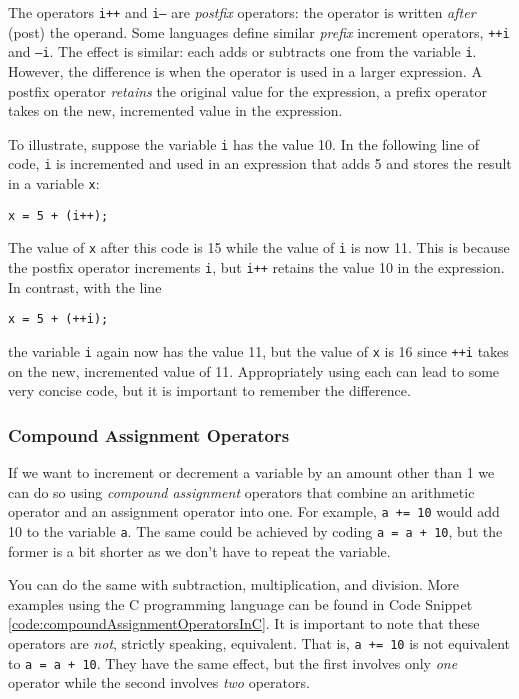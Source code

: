 The operators \texttt{i++} and \texttt{i--} are \emph{postfix} 
operators: the operator is written \emph{after} (post) the operand.  Some languages
define similar \emph{prefix} increment operators, \texttt{++i} and \texttt{--i}.
The effect is similar: each adds or subtracts one from the variable \texttt{i}.
However, the difference is when the operator is used in a larger expression.  A
postfix operator \emph{retains} the original value for the expression, a prefix
operator takes on the new, incremented value in the expression.  

To illustrate, suppose the variable \texttt{i} has the value 10.
In the following line of code, \texttt{i} is incremented and used
in an expression that adds 5 and stores the result in a variable \texttt{x}:

\texttt{x = 5 + (i++);}

The value of \texttt{x} after this code is 15 while the value of \texttt{i}
is now 11.  This is because the postfix operator increments \texttt{i}, but 
\texttt{i++} retains the value 10 in the expression.  In contrast, with the
line

\texttt{x = 5 + (++i);}

the variable \texttt{i} again now has the value 11, but the value of \texttt{x}
is 16 since \texttt{++i} takes on the new, incremented value of 11.  
Appropriately using each can lead to some very concise code, but it is 
important to remember the difference.

\subsubsection{Compound Assignment Operators}

If we want to increment or decrement a variable by an amount other than 1
we can do so using \emph{compound assignment} operators that combine
an arithmetic operator and an assignment operator into one.  For example, 
\texttt{a += 10} would add 10 to the variable \texttt{a}.  The
same could be achieved by coding \texttt{a = a + 10}, but the former
is a bit shorter as we don't have to repeat the variable.  

You can do the same with subtraction, multiplication, and division.  More examples
using the C programming language can be found in Code Snippet 
\ref{code:compoundAssignmentOperatorsInC}.  It is important to
note that these operators are \emph{not}, strictly speaking, equivalent.  
That is, \texttt{a += 10} is not equivalent to 
\texttt{a = a + 10}.  They have
the same effect, but the first involves only \emph{one} operator while the second
involves \emph{two} operators.

